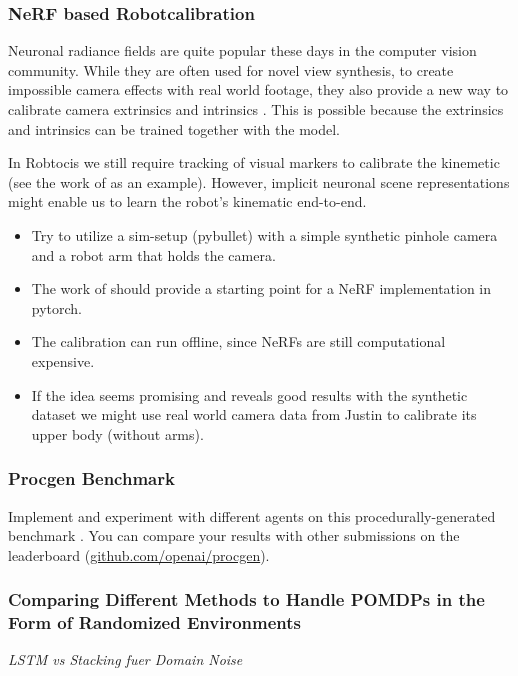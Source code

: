 \documentclass[a4paper]{article}
\begin{document}
\subsubsection{NeRF based Robotcalibration}
Neuronal radiance fields are quite popular these days in the computer vision community. While they are often used for novel view synthesis, to create impossible camera effects with real world footage, they also provide a new way to calibrate camera extrinsics and intrinsics \cite{lin2021barf, Sucar:etal:ICCV2021, wang2021nerfmm, SCNeRF2021}.
This is possible because the extrinsics and intrinsics can be trained together with the model.

In Robtocis we still require tracking of visual markers to calibrate the kinemetic (see the work of \cite{Birbach2014} as an example). However, implicit neuronal scene representations might enable us to learn the robot's kinematic end-to-end.

\begin{itemize}
  \item Try to utilize a sim-setup (pybullet) with a simple synthetic pinhole camera and a robot arm that holds the camera.
  \item The work of \cite{SCNeRF2021} should provide a starting point for a NeRF implementation in pytorch.
  \item The calibration can run offline, since NeRFs are still computational expensive.
  \item If the idea seems promising and reveals good results with the synthetic dataset we might use real world camera data from Justin to calibrate its upper body (without arms).
\end{itemize}





\subsubsection{Procgen Benchmark}
Implement and experiment with different agents on this procedurally-generated benchmark \cite{procgen2020}. 
You can compare your results with other submissions on the leaderboard (\url{github.com/openai/procgen}).

\subsubsection{Comparing Different Methods to Handle POMDPs in the Form of Randomized Environments}
\textit{LSTM vs Stacking fuer Domain Noise}
\end{document}
